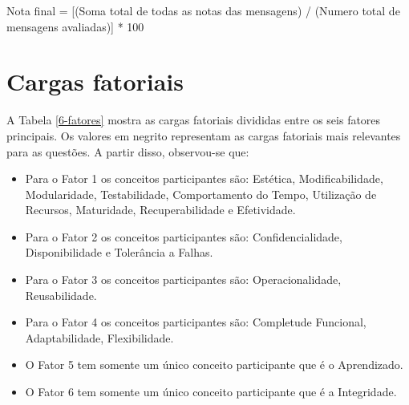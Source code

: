 \begin{apendicesenv}
Nota final = [(Soma total de todas as notas das mensagens) / (Numero total de mensagens avaliadas)] * 100 

\chapter{Cargas fatoriais}
\label{cargas_fatoriais_apendice}

A Tabela \ref{6-fatores} mostra as cargas fatoriais divididas entre os seis fatores principais. Os valores em negrito representam as cargas fatoriais mais relevantes para as questões. A partir disso, observou-se que:



\begin{itemize}
\item Para o Fator 1 os conceitos participantes são: Estética, Modificabilidade, Modularidade, Testabilidade, Comportamento do Tempo, Utilização de Recursos, Maturidade, Recuperabilidade e Efetividade.  
\item Para o Fator 2 os conceitos participantes são: Confidencialidade, Disponibilidade e Tolerância a Falhas.
\item Para o Fator 3 os conceitos participantes são: Operacionalidade, Reusabilidade.
\item Para o Fator 4 os conceitos participantes são: Completude Funcional, Adaptabilidade, Flexibilidade.
\item O Fator 5 tem somente um único conceito participante que é o Aprendizado.
\item O Fator 6 tem somente um único conceito participante que é a Integridade. 
\end{itemize}



\end{apendicesenv}

